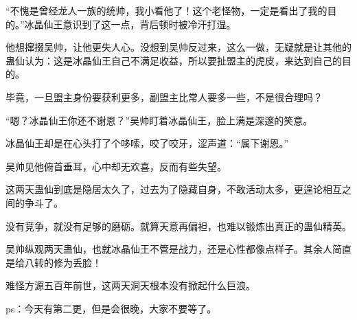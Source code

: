 \begin{this_body}
“不愧是曾经龙人一族的统帅，我小看他了！这个老怪物，一定是看出了我的目的。”冰晶仙王意识到了这一点，背后顿时被冷汗打湿。

他想撺掇吴帅，让他更失人心。没想到吴帅反过来，这么一做，无疑就是让其他的蛊仙认为：这是冰晶仙王自己不满足收益，所以要扯盟主的虎皮，来达到自己的目的。

毕竟，一旦盟主身份要获利更多，副盟主比常人要多一些，不是很合理吗？

“嗯？冰晶仙王你还不谢恩？”吴帅盯着冰晶仙王，脸上满是深邃的笑意。

冰晶仙王却是在心头打了个哆嗦，咬了咬牙，涩声道：“属下谢恩。”

吴帅见他俯首垂耳，心中却无欢喜，反而有些失望。

这两天蛊仙到底是隐居太久了，过去为了隐藏自身，不敢活动太多，更遑论相互之间的争斗了。

没有竞争，就没有足够的磨砺。就算天意再偏袒，也难以锻炼出真正的蛊仙精英。

吴帅纵观两天蛊仙，也就冰晶仙王不管是战力，还是心性都像点样子。其余人简直是给八转的修为丢脸！

难怪方源五百年前世，这两天洞天根本没有掀起什么巨浪。

ps：今天有第二更，但是会很晚，大家不要等了。

\end{this_body}

